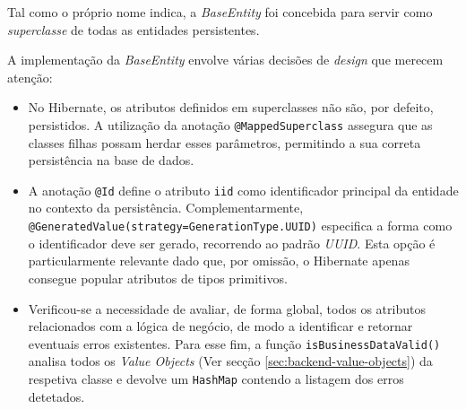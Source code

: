 Tal como o próprio nome indica, a \textit{BaseEntity} foi concebida para servir como \textit{superclasse} de todas as entidades persistentes.

A implementação da \textit{BaseEntity} envolve várias decisões de \textit{design} que merecem atenção:

\begin{itemize}
    \item No \gls{Hibernate}, os atributos definidos em superclasses não são, por defeito, persistidos. A utilização da anotação \lstinline|@MappedSuperclass| assegura que as classes filhas possam herdar esses parâmetros, permitindo a sua correta persistência na base de dados.

    \item A anotação \lstinline|@Id| define o atributo \lstinline|iid| como identificador principal da entidade no contexto da persistência. Complementarmente, \lstinline|@GeneratedValue(strategy=GenerationType.UUID)| especifica a forma como o identificador deve ser gerado, recorrendo ao padrão \textit{UUID}. Esta opção é particularmente relevante dado que, por omissão, o \gls{Hibernate} apenas consegue popular atributos de tipos primitivos.
    
    \item Verificou-se a necessidade de avaliar, de forma global, todos os atributos relacionados com a lógica de negócio, de modo a identificar e retornar eventuais erros existentes. Para esse fim, a função \lstinline|isBusinessDataValid()| analisa todos os \textit{Value Objects} (Ver secção \ref{sec:backend-value-objects}) da respetiva classe e devolve um \lstinline|HashMap| contendo a listagem dos erros detetados.
\end{itemize}

